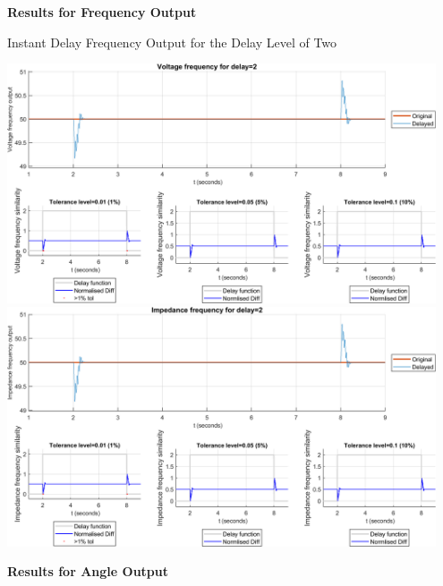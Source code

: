 \newpage \textbf{Results for Frequency Output}
\begin{floatingfigure}[p]{\textwidth}
    \caption{Instant Delay Frequency Output for the Delay Level of Two}
    \includegraphics[width=0.95\textwidth]{PMUsim-figures/DelayOf_2/Instant_vFrequency.png}    
    \label{fig:PMUsim_Two_vFrequency}
    \includegraphics[width=0.95\textwidth]{PMUsim-figures/DelayOf_2/Instant_iFrequency.png}    
    \label{fig:PMUsim_Two_Frequency}
\end{floatingfigure}
        \begin{small}
     \end{small}


\newpage \textbf{Results for Angle Output}



